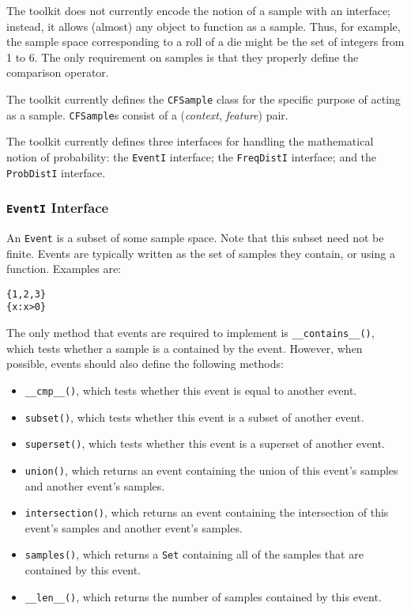 \documentclass{article}
\begin{document}
The toolkit does not currently encode the notion of a sample with an
interface; instead, it allows (almost) any object to function as a
sample.  Thus, for example, the sample space corresponding to a roll
of a die might be the set of integers from 1 to 6.  The only
requirement on samples is that they properly define the comparison
operator. 

The toolkit currently defines the \texttt{CFSample} class for the
specific purpose of acting as a sample.  \texttt{CFSample}s consist of 
a (\emph{context}, \emph{feature}) pair.

The toolkit currently defines three interfaces for handling the
mathematical notion of probability: the \texttt{EventI} interface; the
\texttt{FreqDistI} interface; and the \texttt{ProbDistI} interface.

\subsubsection{\texttt{EventI} Interface}

    An \texttt{Event} is a subset of some sample space.  Note that
    this subset need not be finite.  Events are typically written as
    the set of samples they contain, or using a function.  Examples
    are:

\begin{verbatim}
{1,2,3}
{x:x>0}
\end{verbatim}

    The only method that events are required to implement is
    \texttt{\_\_contains\_\_()}, which tests whether a sample is a
    contained by the event.  However, when possible, events should
    also define the following methods:
    \begin{itemize}
      \item \texttt{\_\_cmp\_\_()}, which tests whether this event is
           equal to another event.
      \item \texttt{subset()}, which tests whether this event is a
           subset of another event.
      \item \texttt{superset()}, which tests whether this event is
           a superset of another event.
      \item \texttt{union()}, which returns an event containing the
           union of this event's samples and another event's samples.
      \item \texttt{intersection()}, which returns an event
           containing the intersection of this event's samples and
           another event's samples.
      \item \texttt{samples()}, which returns a \texttt{Set}
           containing all of the samples that are contained by this
           event. 
      \item \texttt{\_\_len\_\_()}, which returns the number of samples 
           contained by this event.
    \end{itemize}
    
\end{document}
